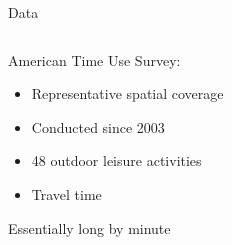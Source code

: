 \documentclass[notes,11pt, aspectratio=169]{beamer}
\newenvironment{wideitemize}{\itemize\addtolength{\itemsep}{10pt}}{\enditemize}
\begin{document}

\begin{frame}{Data}

\begin{columns}[T] %
\begin{column}{.4\textwidth}
  \begin{wideitemize}
  \item American Time Use Survey: 
    \begin{itemize}
        \item Representative spatial coverage
        \item Conducted since 2003
        \item 48 outdoor leisure activities
        \item Travel time
    \end{itemize}  
  \item Essentially long by minute 


  \end{wideitemize}
\end{column}%
\hfill%
\begin{column}{.58\textwidth}
\end{column}%
\end{columns}
\end{frame}
\end{document}

